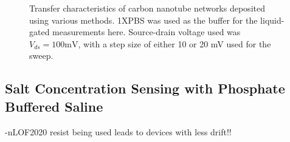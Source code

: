 \documentclass[
  letterpaper,
  DIV=11,
  numbers=noendperiod]{scrartcl}
\begin{document}
\begin{figure}
\begin{minipage}[t]{0.49\linewidth}
{{}

}

\end{minipage}%

\caption{\label{fig-pristine-cnt-characteristics}Transfer
characteristics of carbon nanotube networks deposited using various
methods. 1XPBS was used as the buffer for the liquid-gated measurements
here. Source-drain voltage used was \(V_{ds} = 100 \textrm{mV}\), with a
step size of either 10 or 20 mV used for the sweep.}

\end{figure}

\hypertarget{sec-dummy-sensing}{%
\subsection{Salt Concentration Sensing with Phosphate Buffered
Saline}\label{sec-dummy-sensing}}

-nLOF2020 resist being used leads to devices with less drift!!
\end{document}

